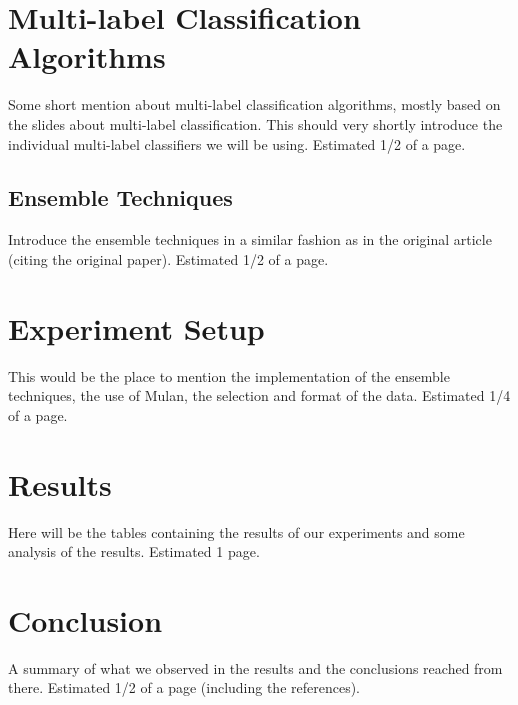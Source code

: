 \documentclass{acm_proc_article-sp}
\begin{document}
\section{Multi-label Classification Algorithms}
Some short mention about multi-label classification algorithms, mostly based on
the slides about multi-label classification. This should very shortly introduce
the individual multi-label classifiers we will be using. Estimated 1/2 of a page.

\subsection*{Ensemble Techniques}
Introduce the ensemble techniques in a similar fashion as in the original
article (citing the original paper). Estimated 1/2 of a page.

\section{Experiment Setup}
This would be the place to mention the implementation of the ensemble
techniques, the use of Mulan, the selection and format of the data. Estimated
1/4 of a page.

\section{Results}
Here will be the tables containing the results of our experiments and some
analysis of the results. Estimated 1 page.

\section{Conclusion}
A summary of what we observed in the results and the conclusions reached from
there. Estimated 1/2 of a page (including the references).



\balancecolumns
\end{document}
